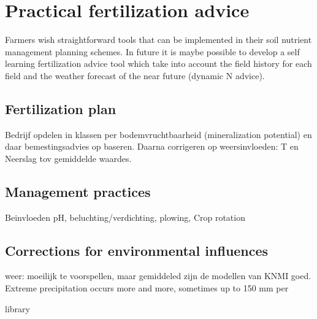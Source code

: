 \documentclass[10pt,twoside,dutch,english]{report}
\begin{document}
	\section{Practical fertilization advice}
	Farmers wish straightforward tools that can be implemented in their soil nutrient management planning schemes. In future it is maybe possible to develop a self learning fertilization advice tool which take into account the field history for each field and the weather forecast of the near future (dynamic N advice). 
    
    
\subsection{Fertilization plan}
Bedrijf opdelen in klassen per bodemvruchtbaarheid (mineralization potential) en daar bemestingsadvies op baseren. Daarna corrigeren op weersinvloeden: T en Neerslag tov gemiddelde waardes. 

\subsection{Management practices}
Beinvloeden pH, beluchting/verdichting, plowing, Crop rotation


    
    \subsection{Corrections for environmental influences}
	weer: moeilijk te voorspellen, maar gemiddeled zijn de modellen van KNMI goed. Extreme precipitation occurs more and more, sometimes up to 150 mm per
 



\linespread{1.0}
\footnotesize 
{}

 {library}
\normalsize 
\linespread{1.3}
\end{document}
